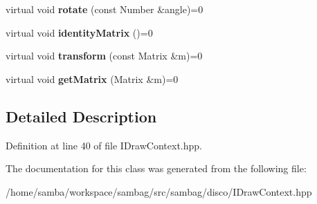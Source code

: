 \begin{DoxyCompactItemize}
\item 
\hypertarget{classsambag_1_1disco_1_1_i_draw_context_aaa66abee764e1cf9a21ff99f4970242a}{
virtual void {\bfseries rotate} (const Number \&angle)=0}
\label{classsambag_1_1disco_1_1_i_draw_context_aaa66abee764e1cf9a21ff99f4970242a}

\item 
\hypertarget{classsambag_1_1disco_1_1_i_draw_context_af445ec1f242f091789865a59d7a36b11}{
virtual void {\bfseries identityMatrix} ()=0}
\label{classsambag_1_1disco_1_1_i_draw_context_af445ec1f242f091789865a59d7a36b11}

\item 
\hypertarget{classsambag_1_1disco_1_1_i_draw_context_acaee8e16ccdf7b29e287ba1e49391453}{
virtual void {\bfseries transform} (const Matrix \&m)=0}
\label{classsambag_1_1disco_1_1_i_draw_context_acaee8e16ccdf7b29e287ba1e49391453}

\item 
\hypertarget{classsambag_1_1disco_1_1_i_draw_context_a84c26f109b3ca41b6d5ae42ee6ea9427}{
virtual void {\bfseries getMatrix} (Matrix \&m)=0}
\label{classsambag_1_1disco_1_1_i_draw_context_a84c26f109b3ca41b6d5ae42ee6ea9427}

\end{DoxyCompactItemize}


\subsection{Detailed Description}


Definition at line 40 of file IDrawContext.hpp.



The documentation for this class was generated from the following file:\begin{DoxyCompactItemize}
\item 
/home/samba/workspace/sambag/src/sambag/disco/IDrawContext.hpp\end{DoxyCompactItemize}
